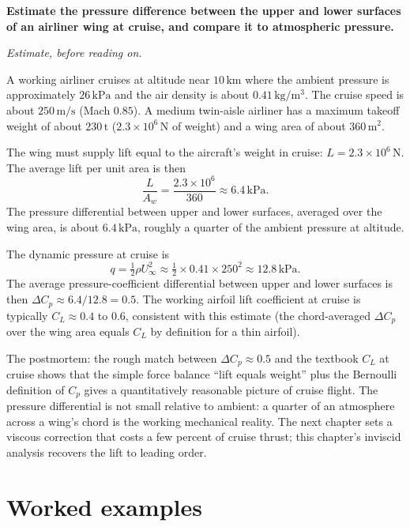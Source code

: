 \begin{estimation}
\textbf{Estimate the pressure difference between the upper and
lower surfaces of an airliner wing at cruise, and compare it to
atmospheric pressure.}

\smallskip
\textit{Estimate, before reading on.}

\smallskip
A working airliner cruises at altitude near $10\,\si{\kilo\meter}$
where the ambient pressure is approximately $26\,\text{kPa}$ and
the air density is about $0.41\,\si{\kilogram\per\meter\cubed}$.
The cruise speed is about $250\,\si{\meter\per\second}$ (Mach
$0.85$). A medium twin-aisle airliner has a maximum takeoff weight
of about $230\,\text{t}$ ($2.3\times 10^6\,\si{\newton}$ of weight)
and a wing area of about $360\,\si{\meter}^2$.

The wing must supply lift equal to the aircraft's weight in cruise:
$L = 2.3\times 10^6\,\si{\newton}$. The average lift per unit area
is then
\[
\frac{L}{A_w} = \frac{2.3\times 10^6}{360} \approx 6.4\,\text{kPa}.
\]
The pressure differential between upper and lower surfaces,
averaged over the wing area, is about $6.4\,\text{kPa}$, roughly
a quarter of the ambient pressure at altitude.

The dynamic pressure at cruise is
\[
q = \tfrac{1}{2}\rho U_\infty^2 \approx \tfrac{1}{2}\times 0.41
\times 250^2 \approx 12.8\,\text{kPa}.
\]
The average pressure-coefficient differential between upper and
lower surfaces is then $\Delta C_p \approx 6.4/12.8 = 0.5$. The
working airfoil lift coefficient at cruise is typically
$C_L \approx 0.4$ to $0.6$, consistent with this estimate (the
chord-averaged $\Delta C_p$ over the wing area equals $C_L$ by
definition for a thin airfoil).

The postmortem: the rough match between $\Delta C_p \approx 0.5$
and the textbook $C_L$ at cruise shows that the simple force
balance ``lift equals weight'' plus the Bernoulli definition of
$C_p$ gives a quantitatively reasonable picture of cruise flight.
The pressure differential is not small relative to ambient: a
quarter of an atmosphere across a wing's chord is the working
mechanical reality. The next chapter sets a viscous correction
that costs a few percent of cruise thrust; this chapter's inviscid
analysis recovers the lift to leading order.
\end{estimation}

\section{Worked examples}

